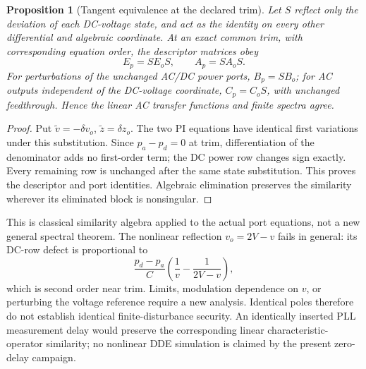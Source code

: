 \documentclass[11pt]{article}
\newtheorem{proposition}[theorem]{Proposition}
\begin{document}
\begin{proposition}[Tangent equivalence at the declared trim]
Let $S$ reflect only the deviation of each DC-voltage state, and act as the
identity on every other differential and algebraic coordinate. At an exact
common trim, with corresponding equation order, the descriptor matrices obey
\begin{equation}
 E_p=SE_oS,\qquad A_p=SA_oS.\label{eq:dc-similarity-bridge}
\end{equation}
For perturbations of the unchanged AC/DC power ports, $B_p=SB_o$; for AC
outputs independent of the DC-voltage coordinate, $C_p=C_oS$, with unchanged
feedthrough. Hence the linear AC transfer functions and finite spectra agree.
\end{proposition}
\begin{proof}
Put $\widetilde v=-\delta v_o$, $\widetilde z=\delta z_o$. The two PI
equations have identical first variations under this substitution. Since
$p_a-p_d=0$ at trim, differentiation of the denominator adds no first-order
term; the DC power row changes sign exactly. Every remaining row is unchanged
after the same state substitution. This proves the descriptor and port
identities. Algebraic elimination preserves the similarity wherever its
eliminated block is nonsingular.
\end{proof}
This is classical similarity algebra applied to the actual port equations,
not a new general spectral theorem. The nonlinear reflection
$v_o=2V-v$ fails in general: its DC-row defect is proportional to
\begin{equation}
 \frac{p_d-p_a}{C}\left(\frac1v-\frac1{2V-v}\right),
\end{equation}
which is second order near trim. Limits, modulation dependence on $v$, or
perturbing the voltage reference require a new analysis. Identical poles
therefore do not establish identical finite-disturbance security. An
identically inserted PLL measurement delay would preserve the corresponding
linear characteristic-operator similarity; no nonlinear DDE simulation is
claimed by the present zero-delay campaign.
\end{document}
